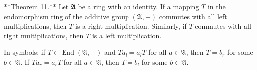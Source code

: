 **Theorem 11.** Let $\mathfrak{A}$ be a ring with an identity. If a mapping $T$ in the endomorphism ring of the additive group $(\mathfrak{A}, +)$ commutes with all left multiplications, then $T$ is a right multiplication. Similarly, if $T$ commutes with all right multiplications, then $T$ is a left multiplication.

In symbols: if $T \in \operatorname{End}(\mathfrak{A}, +)$ and $T a_l = a_l T$ for all $a \in \mathfrak{A}$, then $T = b_r$ for some $b \in \mathfrak{A}$. If $T a_r = a_r T$ for all $a \in \mathfrak{A}$, then $T = b_l$ for some $b \in \mathfrak{A}$.
